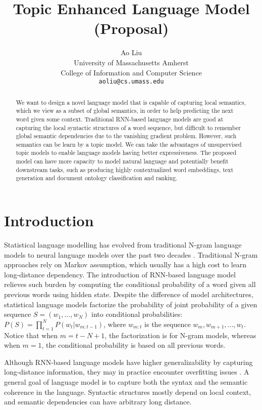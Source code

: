 \documentclass[11pt,a4paper]{article}
\title{Topic Enhanced Language Model (Proposal)}
\author{Ao Liu\\
  University of Massachusetts Amherst\\
  College of Information and Computer Science\\
  {\tt aoliu@cs.umass.edu}
  }
\begin{document}
\maketitle
\begin{abstract}
  We want to design a novel language model that is capable of capturing local semantics, which we view as a subset of global semantics, in order to help predicting the next word given some context. Traditional RNN-based language models are good at capturing the local syntactic structures of a word sequence, but difficult to remember global semantic dependencies due to the vanishing gradient problem. However, such semantics can be learn by a topic model. We can take the advantages of unsupervised topic models to enable language models having better expressiveness. The proposed model can have more capacity to model natural language and potentially benefit downstream tasks, such as producing highly contextualized word embeddings, text generation and document ontology classification and ranking.
\end{abstract}

\section{Introduction}
\label{sec:intro}
Statistical language modelling has evolved from traditional N-gram language models to neural language models over the past two decades \citep{bengio2003neural}. Traditional N-gram approaches rely on Markov assumption, which usually has a high cost to learn long-distance dependency. The introduction of RNN-based language model relieves such burden by computing the conditional probability of a word given all previous words using hidden state\citep{mikolov2010recurrent}. Despite the difference of model architectures, statistical language models factorize the probability of joint probability of a given sequence $S = (w_1, ..., w_N)$ into conditional probabilities: $P(S) = \prod\limits_{t=1}^N P(w_t | w_{m:t - 1})$, where $w_{m:t}$ is the sequence $w_m, w_{m + 1}, ..., w_t$. Notice that when $m = t - N + 1$, the factorization is for N-gram models, whereas when $m = 1$, the conditional probability is based on all previous words.

Although RNN-based language models have higher generalizability by capturing long-distance information, they may in practice encounter overfitting issues \citep{srivastava2014dropout}. A general goal of language model is to capture both the syntax and the semantic coherence in the language. Syntactic structures mostly depend on local context, and semantic dependencies can have arbitrary long distance.
\end{document}
